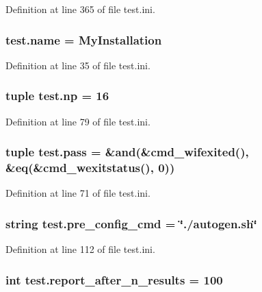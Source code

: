 Definition at line 365 of file test.\-ini.

\hypertarget{namespacetest_ac5ddc75d7029ace1bfb95e457e5c3510}{
\subsubsection[{name}]{\setlength{\rightskip}{0pt plus 5cm}test.\-name = My\-Installation}}\label{namespacetest_ac5ddc75d7029ace1bfb95e457e5c3510}


Definition at line 35 of file test.\-ini.

\hypertarget{namespacetest_a1535a7960a63eaf5e78bb6685abd44e8}{
\subsubsection[{np}]{\setlength{\rightskip}{0pt plus 5cm}tuple test.\-np = 16}}\label{namespacetest_a1535a7960a63eaf5e78bb6685abd44e8}


Definition at line 79 of file test.\-ini.

\hypertarget{namespacetest_abc155792ba7b2057124cc069e596899f}{
\subsubsection[{pass}]{\setlength{\rightskip}{0pt plus 5cm}tuple test.\-pass = \&and(\&cmd\-\_\-wifexited(), \&eq(\&cmd\-\_\-wexitstatus(), 0))}}\label{namespacetest_abc155792ba7b2057124cc069e596899f}


Definition at line 71 of file test.\-ini.

\hypertarget{namespacetest_a96c17bd039b26da494c806d745289285}{
\subsubsection[{pre\-\_\-config\-\_\-cmd}]{\setlength{\rightskip}{0pt plus 5cm}string test.\-pre\-\_\-config\-\_\-cmd = \char`\"{}./autogen.\-sh\char`\"{}}}\label{namespacetest_a96c17bd039b26da494c806d745289285}


Definition at line 112 of file test.\-ini.

\hypertarget{namespacetest_a86e28e32de6c6c5e79ed64d05f513b97}{
\subsubsection[{report\-\_\-after\-\_\-n\-\_\-results}]{\setlength{\rightskip}{0pt plus 5cm}int test.\-report\-\_\-after\-\_\-n\-\_\-results = 100}}\label{namespacetest_a86e28e32de6c6c5e79ed64d05f513b97}


